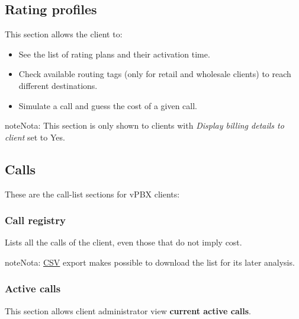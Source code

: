\documentclass[letterpaper,10pt,spanish]{sphinxmanual}
\begin{document}
\subsection{Rating profiles}
\label{administration_portal/client/vpbx/rating_profiles:rating-profiles}\label{administration_portal/client/vpbx/rating_profiles::doc}
This section allows the client to:
\begin{itemize}
\item {} 
See the list of rating plans and their activation time.

\item {} 
Check available routing tags (only for retail and wholesale clients) to reach different destinations.

\item {} 
Simulate a call and guess the cost of a given call.

\end{itemize}

\begin{notice}{note}{Nota:}
This section is only shown to clients with \emph{Display billing details to client} set to Yes.
\end{notice}


\subsection{Calls}
\label{administration_portal/client/vpbx/calls/index::doc}\label{administration_portal/client/vpbx/calls/index:calls}
These are the call-list sections for vPBX clients:


\subsubsection{Call registry}
\label{administration_portal/client/vpbx/calls/call_registry::doc}\label{administration_portal/client/vpbx/calls/call_registry:call-registry}\label{administration_portal/client/vpbx/calls/call_registry:id1}
Lists all the calls of the client, even those that do not imply cost.

\begin{notice}{note}{Nota:}
\href{https://es.wikipedia.org/wiki/CSV}{CSV} export makes possible to
download the list for its later analysis.
\end{notice}


\subsubsection{Active calls}
\label{administration_portal/client/vpbx/calls/active_calls::doc}\label{administration_portal/client/vpbx/calls/active_calls:active-calls}
This section allows client administrator view \textbf{current active calls}.
\end{document}
